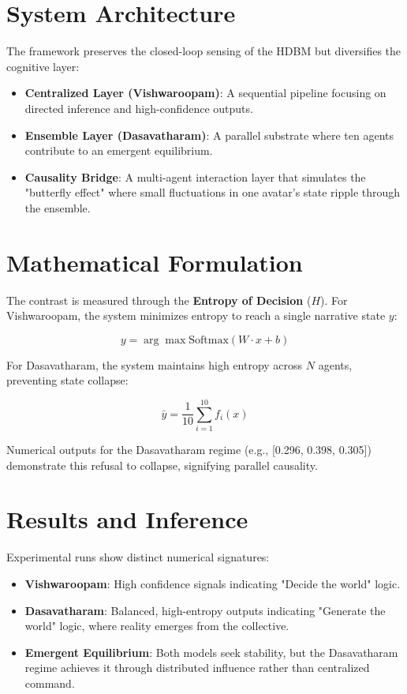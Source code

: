 \documentclass[12pt]{article}
\begin{document}
\section{System Architecture}

The framework preserves the closed-loop sensing of the HDBM but diversifies the cognitive layer:

\begin{itemize}
\item \textbf{Centralized Layer (Vishwaroopam)}: A sequential pipeline focusing on directed inference and high-confidence outputs.
\item \textbf{Ensemble Layer (Dasavatharam)}: A parallel substrate where ten agents contribute to an emergent equilibrium.
\item \textbf{Causality Bridge}: A multi-agent interaction layer that simulates the "butterfly effect" where small fluctuations in one avatar's state ripple through the ensemble.
\end{itemize}

\section{Mathematical Formulation}

The contrast is measured through the \textbf{Entropy of Decision} ($H$). For Vishwaroopam, the system minimizes entropy to reach a single narrative state $y$:

\[
y = \arg\max \text{Softmax}(W \cdot x + b)
\]

For Dasavatharam, the system maintains high entropy across $N$ agents, preventing state collapse:

\[
\bar{y} = \frac{1}{10} \sum_{i=1}^{10} f_i(x)
\]

Numerical outputs for the Dasavatharam regime (e.g., [0.296, 0.398, 0.305]) demonstrate this refusal to collapse, signifying parallel causality.

\section{Results and Inference}

Experimental runs show distinct numerical signatures:
\begin{itemize}
\item \textbf{Vishwaroopam}: High confidence signals indicating "Decide the world" logic.
\item \textbf{Dasavatharam}: Balanced, high-entropy outputs indicating "Generate the world" logic, where reality emerges from the collective.
\item \textbf{Emergent Equilibrium}: Both models seek stability, but the Dasavatharam regime achieves it through distributed influence rather than centralized command.
\end{itemize}
\end{document}
